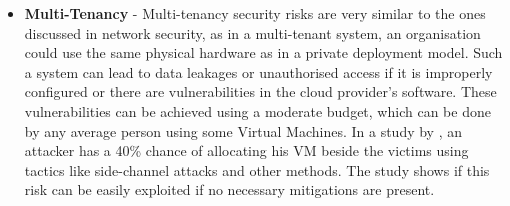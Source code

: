 \begin{itemize}
    \item \textbf{Multi-Tenancy} - Multi-tenancy security risks are very similar to the ones discussed in network security, as in a multi-tenant system, an organisation could use the same physical hardware as in a private deployment model. Such a system can lead to data leakages or unauthorised access if it is improperly configured or there are vulnerabilities in the cloud provider's software. These vulnerabilities can be achieved using a moderate budget, which can be done by any average person using some Virtual Machines. In a study by \cite{multi_tenancy_cloud_risk}, an attacker has a 40\% chance of allocating his VM beside the victims using tactics like side-channel attacks and other methods. The study shows if this risk can be easily exploited if no necessary mitigations are present.
\end{itemize}

